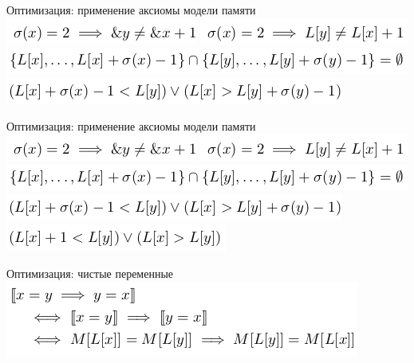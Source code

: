 \documentclass{beamer}
\begin{document}
\begin{frame}{Оптимизация: применение аксиомы модели памяти}
\includegraphics[scale=0.5]{meory1.png}\newline
\includegraphics[scale=0.5]{meory2.png}\newline
\includegraphics[scale=0.5]{meory3.png}\newline
\includegraphics[scale=0.5]{meory4.png}\newline
\end{frame}

\begin{frame}{Оптимизация: применение аксиомы модели памяти}
\includegraphics[scale=0.5]{meory1.png}\newline
\includegraphics[scale=0.5]{meory2.png}\newline
\includegraphics[scale=0.5]{meory3.png}\newline
\includegraphics[scale=0.5]{meory4.png}\newline
\includegraphics[scale=0.5]{meory5.png}\newline
\end{frame}

\begin{frame}{Оптимизация: чистые переменные}
\includegraphics[scale=0.5]{ex_pure.png}\newline
\end{frame}
\end{document}
